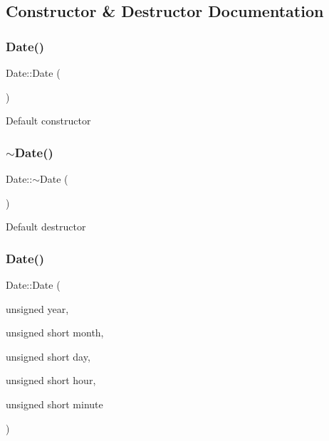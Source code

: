 \subsection{Constructor \& Destructor Documentation}
\mbox{\label{class_date_a4e59ed4ba66eec61c27460c5d09fa1bd}} 
\subsubsection{\texorpdfstring{Date()}{Date()}\hspace{0.1cm}{\footnotesize\ttfamily [1/3]}}
{\footnotesize\ttfamily Date\+::\+Date (\begin{DoxyParamCaption}{ }\end{DoxyParamCaption})}

Default constructor \mbox{\label{class_date_ade4b469433b7966cc034cbcc6799233b}} 
\subsubsection{\texorpdfstring{$\sim$\+Date()}{~Date()}}
{\footnotesize\ttfamily Date\+::$\sim$\+Date (\begin{DoxyParamCaption}{ }\end{DoxyParamCaption})}

Default destructor \mbox{\label{class_date_a5277264fbbce7f4ebfcbcc362d6d62e7}} 
\subsubsection{\texorpdfstring{Date()}{Date()}\hspace{0.1cm}{\footnotesize\ttfamily [2/3]}}
{\footnotesize\ttfamily Date\+::\+Date (\begin{DoxyParamCaption}\item[{unsigned}]{year,  }\item[{unsigned short}]{month,  }\item[{unsigned short}]{day,  }\item[{unsigned short}]{hour,  }\item[{unsigned short}]{minute }\end{DoxyParamCaption})}



